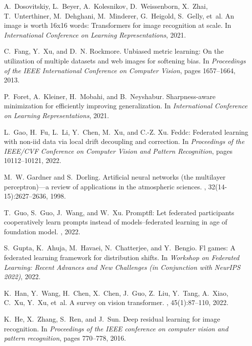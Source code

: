 \documentclass[11pt]{article}
\begin{document}
\begin{thebibliography}{10}
A.~Dosovitskiy, L.~Beyer, A.~Kolesnikov, D.~Weissenborn, X.~Zhai,
  T.~Unterthiner, M.~Dehghani, M.~Minderer, G.~Heigold, S.~Gelly, et~al.
\newblock An image is worth 16x16 words: Transformers for image recognition at
  scale.
\newblock In {\em International Conference on Learning Representations}, 2021.

C.~Fang, Y.~Xu, and D.~N. Rockmore.
\newblock Unbiased metric learning: On the utilization of multiple datasets and
  web images for softening bias.
\newblock In {\em Proceedings of the IEEE International Conference on Computer
  Vision}, pages 1657--1664, 2013.

P.~Foret, A.~Kleiner, H.~Mobahi, and B.~Neyshabur.
\newblock Sharpness-aware minimization for efficiently improving
  generalization.
\newblock In {\em International Conference on Learning Representations}, 2021.

L.~Gao, H.~Fu, L.~Li, Y.~Chen, M.~Xu, and C.-Z. Xu.
\newblock Feddc: Federated learning with non-iid data via local drift
  decoupling and correction.
\newblock In {\em Proceedings of the IEEE/CVF Conference on Computer Vision and
  Pattern Recognition}, pages 10112--10121, 2022.

M.~W. Gardner and S.~Dorling.
\newblock Artificial neural networks (the multilayer perceptron)—a review of
  applications in the atmospheric sciences.
, 32(14-15):2627--2636, 1998.

T.~Guo, S.~Guo, J.~Wang, and W.~Xu.
\newblock Promptfl: Let federated participants cooperatively learn prompts
  instead of models--federated learning in age of foundation model.
, 2022.

S.~Gupta, K.~Ahuja, M.~Havaei, N.~Chatterjee, and Y.~Bengio.
\newblock Fl games: A federated learning framework for distribution shifts.
\newblock In {\em Workshop on Federated Learning: Recent Advances and New
  Challenges (in Conjunction with NeurIPS 2022)}, 2022.

K.~Han, Y.~Wang, H.~Chen, X.~Chen, J.~Guo, Z.~Liu, Y.~Tang, A.~Xiao, C.~Xu,
  Y.~Xu, et~al.
\newblock A survey on vision transformer.
,
  45(1):87--110, 2022.

K.~He, X.~Zhang, S.~Ren, and J.~Sun.
\newblock Deep residual learning for image recognition.
\newblock In {\em Proceedings of the IEEE conference on computer vision and
  pattern recognition}, pages 770--778, 2016.


\end{thebibliography}
\end{document}
